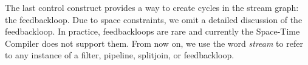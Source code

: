 The last control construct provides a way to create cycles in the
stream graph: the feedbackloop.  Due to space constraints, we omit a
detailed discussion of the feedbackloop. In practice, feedbackloops
are rare and currently the Space-Time Compiler does not support
them. From now on, we use the word {\it stream} to refer to any
instance of a filter, pipeline, splitjoin, or feedbackloop.

